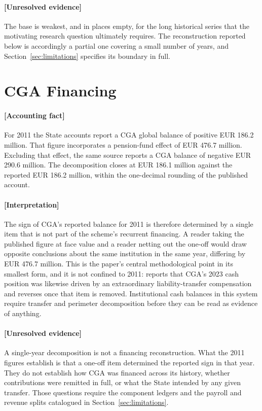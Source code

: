 \documentclass[11pt]{article}
\begin{document}
\paragraph{[Unresolved evidence]}
The base is weakest, and in places empty, for the long historical series that the motivating research question ultimately requires. The reconstruction reported below is accordingly a partial one covering a small number of years, and Section~\ref{sec:limitations} specifies its boundary in full.

\section{CGA Financing}
\label{sec:cga}
\paragraph{[Accounting fact]}
For 2011 the State accounts report a CGA global balance of positive EUR 186.2 million. That figure incorporates a pension-fund effect of EUR 476.7 million. Excluding that effect, the same source reports a CGA balance of negative EUR 290.6 million. The decomposition closes at EUR 186.1 million against the reported EUR 186.2 million, within the one-decimal rounding of the published account.

\paragraph{[Interpretation]}
The sign of CGA's reported balance for 2011 is therefore determined by a single item that is not part of the scheme's recurrent financing. A reader taking the published figure at face value and a reader netting out the one-off would draw opposite conclusions about the same institution in the same year, differing by EUR 476.7 million. This is the paper's central methodological point in its smallest form, and it is not confined to 2011: \citet{cfp_2024_cga_outturn} reports that CGA's 2023 cash position was likewise driven by an extraordinary liability-transfer compensation and reverses once that item is removed. Institutional cash balances in this system require transfer and perimeter decomposition before they can be read as evidence of anything.

\paragraph{[Unresolved evidence]}
A single-year decomposition is not a financing reconstruction. What the 2011 figures establish is that a one-off item determined the reported sign in that year. They do not establish how CGA was financed across its history, whether contributions were remitted in full, or what the State intended by any given transfer. Those questions require the component ledgers and the payroll and revenue splits catalogued in Section~\ref{sec:limitations}.
\end{document}
